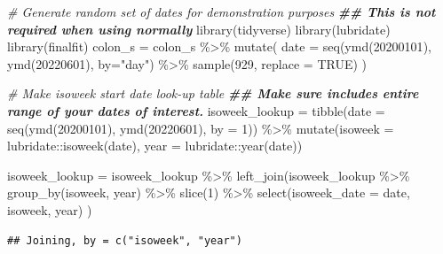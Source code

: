 \documentclass[
]{book}
\newenvironment{Shaded}{\begin{snugshade}}{\end{snugshade}}
\newcommand{\AttributeTok}[1]{\textcolor[rgb]{0.77,0.63,0.00}{#1}}
\newcommand{\CommentTok}[1]{\textcolor[rgb]{0.56,0.35,0.01}{\textit{#1}}}
\newcommand{\ConstantTok}[1]{\textcolor[rgb]{0.00,0.00,0.00}{#1}}
\newcommand{\DecValTok}[1]{\textcolor[rgb]{0.00,0.00,0.81}{#1}}
\newcommand{\DocumentationTok}[1]{\textcolor[rgb]{0.56,0.35,0.01}{\textbf{\textit{#1}}}}
\newcommand{\FunctionTok}[1]{\textcolor[rgb]{0.00,0.00,0.00}{#1}}
\newcommand{\NormalTok}[1]{#1}
\newcommand{\OtherTok}[1]{\textcolor[rgb]{0.56,0.35,0.01}{#1}}
\newcommand{\SpecialCharTok}[1]{\textcolor[rgb]{0.00,0.00,0.00}{#1}}
\newcommand{\StringTok}[1]{\textcolor[rgb]{0.31,0.60,0.02}{#1}}
\begin{document}
\begin{Shaded}
\begin{Highlighting}[]
\CommentTok{\# Generate random set of dates for demonstration purposes}
\DocumentationTok{\#\# This is not required when using normally}
\FunctionTok{library}\NormalTok{(tidyverse)}
\FunctionTok{library}\NormalTok{(lubridate)}
\FunctionTok{library}\NormalTok{(finalfit)}
\NormalTok{colon\_s }\OtherTok{=}\NormalTok{ colon\_s }\SpecialCharTok{\%\textgreater{}\%} 
  \FunctionTok{mutate}\NormalTok{(}
    \AttributeTok{date =} \FunctionTok{seq}\NormalTok{(}\FunctionTok{ymd}\NormalTok{(}\DecValTok{20200101}\NormalTok{), }\FunctionTok{ymd}\NormalTok{(}\DecValTok{20220601}\NormalTok{), }\AttributeTok{by=}\StringTok{"day"}\NormalTok{) }\SpecialCharTok{\%\textgreater{}\%} 
      \FunctionTok{sample}\NormalTok{(}\DecValTok{929}\NormalTok{, }\AttributeTok{replace =} \ConstantTok{TRUE}\NormalTok{)}
\NormalTok{  )}

\CommentTok{\# Make isoweek start date look{-}up table}
\DocumentationTok{\#\# Make sure includes entire range of your dates of interest. }
\NormalTok{isoweek\_lookup }\OtherTok{=} \FunctionTok{tibble}\NormalTok{(}\AttributeTok{date =} \FunctionTok{seq}\NormalTok{(}\FunctionTok{ymd}\NormalTok{(}\DecValTok{20200101}\NormalTok{), }\FunctionTok{ymd}\NormalTok{(}\DecValTok{20220601}\NormalTok{), }\AttributeTok{by =} \DecValTok{1}\NormalTok{)) }\SpecialCharTok{\%\textgreater{}\%} 
  \FunctionTok{mutate}\NormalTok{(}\AttributeTok{isoweek =}\NormalTok{ lubridate}\SpecialCharTok{::}\FunctionTok{isoweek}\NormalTok{(date),}
         \AttributeTok{year =}\NormalTok{ lubridate}\SpecialCharTok{::}\FunctionTok{year}\NormalTok{(date))}

\NormalTok{isoweek\_lookup }\OtherTok{=}\NormalTok{ isoweek\_lookup }\SpecialCharTok{\%\textgreater{}\%} 
  \FunctionTok{left\_join}\NormalTok{(isoweek\_lookup }\SpecialCharTok{\%\textgreater{}\%} 
              \FunctionTok{group\_by}\NormalTok{(isoweek, year) }\SpecialCharTok{\%\textgreater{}\%} 
              \FunctionTok{slice}\NormalTok{(}\DecValTok{1}\NormalTok{) }\SpecialCharTok{\%\textgreater{}\%} 
              \FunctionTok{select}\NormalTok{(}\AttributeTok{isoweek\_date =}\NormalTok{ date, isoweek, year)}
\NormalTok{  )}
\end{Highlighting}
\end{Shaded}

\begin{verbatim}
## Joining, by = c("isoweek", "year")
\end{verbatim}
\end{document}

